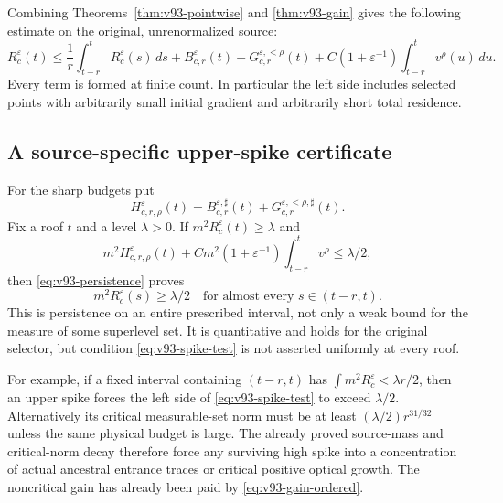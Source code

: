 Combining Theorems~\ref{thm:v93-pointwise} and \ref{thm:v93-gain}
gives the following estimate on the original, unrenormalized source:
\begin{equation}\label{eq:v93-upper-finite}
 R_c^\varepsilon(t)\le
 \frac1r\int_{t-r}^tR_c^\varepsilon(s)\,ds
 +B_{c,r}^\varepsilon(t)+G_{c,r}^{\varepsilon,<\rho}(t)
 +C(1+\varepsilon^{-1})\int_{t-r}^t v^\rho(u)\,du.
\end{equation}
Every term is formed at finite count. In particular the left side
includes selected points with arbitrarily small initial gradient and
arbitrarily short total residence.

\subsection{A source-specific upper-spike certificate}
For the sharp budgets put
\[
 H_{c,r,\rho}^\varepsilon(t)
 =B_{c,r}^{\varepsilon,\sharp}(t)
       +G_{c,r}^{\varepsilon,<\rho,\sharp}(t).
\]
Fix a roof $t$ and a level $\lambda>0$. If
$m^2R_c^\varepsilon(t)\ge\lambda$ and
\begin{equation}\label{eq:v93-spike-test}
 m^2H_{c,r,\rho}^\varepsilon(t)
 +Cm^2(1+\varepsilon^{-1})\int_{t-r}^t v^\rho\le\lambda/2,
\end{equation}
then \eqref{eq:v93-persistence} proves
\begin{equation}\label{eq:v93-spike-width}
 m^2R_c^\varepsilon(s)\ge\lambda/2
            \quad\text{for almost every }s\in(t-r,t).
\end{equation}
This is persistence on an entire prescribed interval, not only a
weak bound for the measure of some superlevel set. It is quantitative
and holds for the original selector, but condition
\eqref{eq:v93-spike-test} is not asserted uniformly at every roof.

For example, if a fixed interval containing $(t-r,t)$ has
$\int m^2R_c^\varepsilon<\lambda r/2$, then an upper spike forces
the left side of \eqref{eq:v93-spike-test} to exceed $\lambda/2$.
Alternatively its critical measurable-set norm must be at least
$(\lambda/2)r^{31/32}$ unless the same physical budget is large.
The already proved source-mass and critical-norm decay therefore
force any surviving high spike into a concentration of actual
ancestral entrance traces or critical positive optical growth.
The noncritical gain has already been paid by
\eqref{eq:v93-gain-ordered}.

